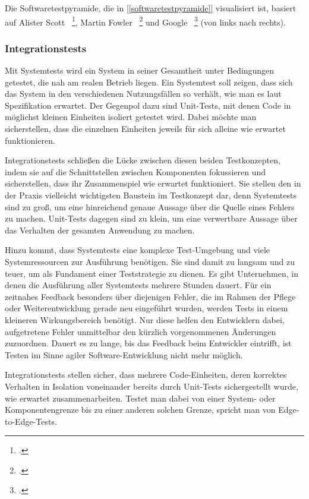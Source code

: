Die Softwaretestpyramide, die in \ref{[softwaretestpyramide]} visualisiert ist, basiert auf Alister Scott ~\footcite[Vgl.]{website:scott.2011}, Martin Fowler
 ~\footcite[Vgl.]{website:fowler.2012} und Google  ~\footcite[Vgl. Seite 12-14]{Whittaker.2012} (von links nach rechts).


\subsubsection{Integrationstests}
Mit Systemtests wird ein System in seiner Gesamtheit unter Bedingungen getestet, die nah am realen Betrieb liegen. Ein Systemtest soll zeigen, dass sich das System in den verschiedenen Nutzungsfällen so verhält, wie man es laut Spezifikation erwartet. Der Gegenpol dazu sind Unit-Tests, mit denen Code in möglichst kleinen Einheiten isoliert getestet wird. Dabei möchte man sicherstellen, dass die einzelnen Einheiten jeweils für sich alleine wie erwartet funktionieren.

Integrationstests schließen die Lücke zwischen diesen beiden Testkonzepten, indem sie auf die Schnittstellen zwischen Komponenten fokussieren und sicherstellen, dass ihr Zusammenspiel wie erwartet funktioniert. Sie stellen den in der Praxis vielleicht wichtigsten Baustein im Testkonzept dar, denn Systemtests sind zu groß, um eine hinreichend genaue Aussage über die Quelle eines Fehlers zu machen. Unit-Tests dagegen sind zu klein, um eine verwertbare Aussage über das Verhalten der gesamten Anwendung zu machen.

Hinzu kommt, dass Systemtests eine komplexe Test-Umgebung und viele Systemressourcen zur Ausführung benötigen. Sie sind damit zu langsam und zu teuer, um als Fundament einer Teststrategie zu dienen. Es gibt Unternehmen, in denen die Ausführung aller Systemtests mehrere Stunden dauert. Für ein zeitnahes Feedback besonders über diejenigen Fehler, die im Rahmen der Pflege oder Weiterentwicklung gerade neu eingeführt wurden, werden Tests in einem kleineren Wirkungsbereich benötigt. Nur diese helfen den Entwicklern dabei, aufgetretene Fehler unmittelbar den kürzlich vorgenommenen Änderungen zuzuordnen. Dauert es zu lange, bis das Feedback beim Entwickler eintrifft, ist Testen im Sinne agiler Software-Entwicklung nicht mehr möglich.

Integrationstests stellen sicher, dass mehrere Code-Einheiten, deren korrektes Verhalten in Isolation voneinander bereits durch Unit-Tests sichergestellt wurde, wie erwartet zusammenarbeiten. Testet man dabei von einer System- oder Komponentengrenze bis zu einer anderen solchen Grenze, spricht man von Edge-to-Edge-Tests.

